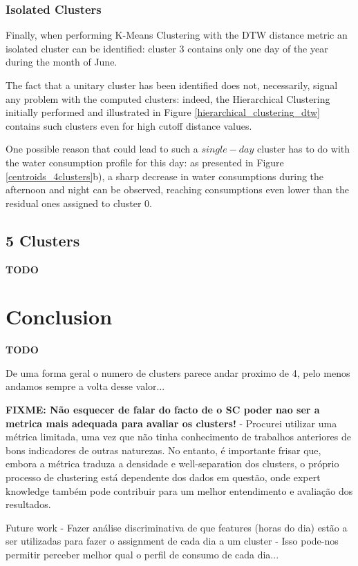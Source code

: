 \documentclass[9pt,journal,compsoc]{IEEEtran}
\begin{document}
\subsubsection{Isolated Clusters}

Finally, when performing K-Means Clustering with the DTW distance metric an isolated cluster can be identified: cluster $3$ contains only one day of the year during the month of June.

The fact that a unitary cluster has been identified does not, necessarily, signal any problem with the computed clusters: indeed, the Hierarchical Clustering initially performed and illustrated in Figure \ref{hierarchical_clustering_dtw} contains such clusters even for high cutoff distance values.

One possible reason that could lead to such a $single-day$ cluster has to do with the water consumption profile for this day: as presented in Figure \ref{centroids_4clusters}b), a sharp decrease in water consumptions during the afternoon and night can be observed, reaching consumptions even lower than the residual ones assigned to cluster $0$.

\subsection{5 Clusters}

\textbf{TODO}

\section{Conclusion}
\label{conclusions}

\textbf{TODO}

De uma forma geral o numero de clusters parece andar proximo de 4, pelo menos andamos sempre a volta desse valor...

\textbf{FIXME: Não esquecer de falar do facto de o SC poder nao ser a metrica mais adequada para avaliar os clusters!} - Procurei utilizar uma métrica limitada, uma vez que não tinha conhecimento de trabalhos anteriores de bons indicadores de outras naturezas. No entanto, é importante frisar que, embora a métrica traduza a densidade e well-separation dos clusters, o próprio processo de clustering está dependente dos dados em questão, onde expert knowledge também pode contribuir para um melhor entendimento e avaliação dos resultados.


Future work - Fazer análise discriminativa de que features (horas do dia) estão a ser utilizadas para fazer o assignment de cada dia a um cluster - Isso pode-nos permitir perceber melhor qual o perfil de consumo de cada dia...




\end{document}
